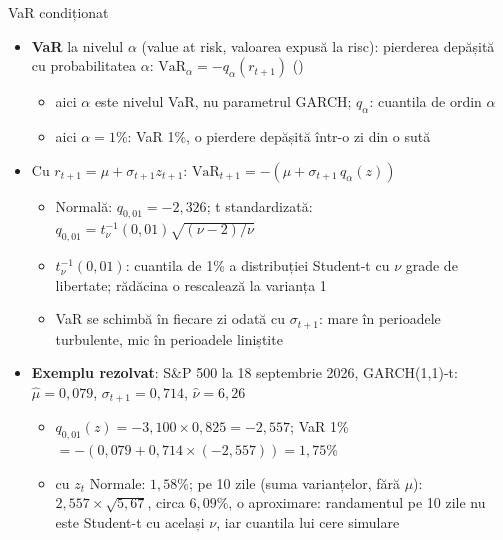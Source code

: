 \begin{frame}{VaR condiționat}
\itemsize{\small}
\begin{itemize}
    \item \textbf{VaR} la nivelul $\alpha$ (value at risk, valoarea expusă la risc): pierderea depășită cu probabilitatea $\alpha$: $\mathrm{VaR}_\alpha = -q_\alpha(r_{t+1})$ ()
    \begin{itemize}
        \item aici $\alpha$ este nivelul VaR, nu parametrul GARCH; $q_\alpha$: cuantila de ordin $\alpha$
        \item aici $\alpha = 1\%$: VaR 1\%, o pierdere depășită într-o zi din o sută
    \end{itemize}
    \item Cu $r_{t+1} = \mu + \sigma_{t+1}z_{t+1}$: $\mathrm{VaR}_{t+1} = -(\mu + \sigma_{t+1}\,q_\alpha(z))$
    \begin{itemize}
        \item Normală: $q_{0{,}01} = -2{,}326$; t standardizată: $q_{0{,}01} = t_\nu^{-1}(0{,}01)\sqrt{(\nu - 2)/\nu}$
        \item $t_\nu^{-1}(0{,}01)$: cuantila de 1\% a distribuției Student-t cu $\nu$ grade de libertate; rădăcina o rescalează la varianța 1
        \item VaR se schimbă în fiecare zi odată cu $\sigma_{t+1}$: mare în perioadele turbulente, mic în perioadele liniștite
    \end{itemize}
    \item \textbf{Exemplu rezolvat}: S\&P 500 la 18 septembrie 2026, GARCH(1,1)-t: $\hat\mu = 0{,}079$, $\sigma_{t+1} = 0{,}714$, $\hat\nu = 6{,}26$
    \begin{itemize}
        \item $q_{0{,}01}(z) = -3{,}100 \times 0{,}825 = -2{,}557$; VaR 1\% $= -(0{,}079 + 0{,}714 \times (-2{,}557)) = 1{,}75\%$
        \item cu $z_t$ Normale: $1{,}58\%$; pe 10 zile (suma varianțelor, fără $\mu$): $2{,}557 \times \sqrt{5{,}67}$, circa $6{,}09\%$, o aproximare: randamentul pe 10 zile nu este Student-t cu același $\nu$, iar cuantila lui cere simulare
    \end{itemize}
\end{itemize}
\end{frame}

